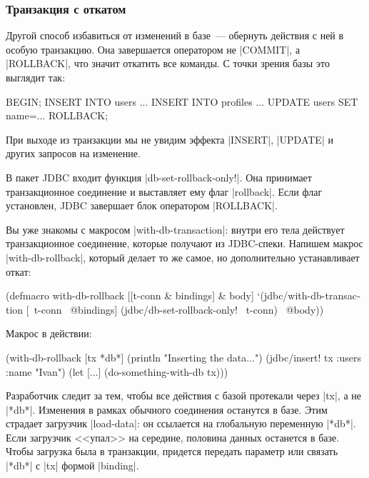 \subsubsection*{Транзакция с откатом}

Другой способ избавиться от изменений в базе~--- обернуть действия с ней в
особую транзакцию. Она завершается оператором не \spverb|COMMIT|, а
\spverb|ROLLBACK|, что значит откатить все команды. С точки зрения базы это
выглядит так:

\begin{english}
  \begin{sql}
BEGIN;
INSERT INTO users ...
INSERT INTO profiles ...
UPDATE users SET name=...
ROLLBACK;
  \end{sql}
\end{english}

При выходе из транзакции мы не увидим эффекта \spverb|INSERT|, \spverb|UPDATE| и
других запросов на изменение.

В пакет JDBC входит функция \spverb|db-set-rollback-only!|. Она принимает
транзакционное соединение и выставляет ему флаг \spverb|rollback|. Если флаг
установлен, JDBC завершает блок оператором \spverb|ROLLBACK|.

Вы уже знакомы с макросом \spverb|with-db-transaction|: внутри его тела
действует транзакционное соединение, которые получают из JDBC-спеки. Напишем
макрос \spverb|with-db-rollback|, который делает то же самое, но дополнительно
устанавливает откат:

\begin{english}
  \begin{clojure}
(defmacro with-db-rollback
  [[t-conn & bindings] & body]
  `(jdbc/with-db-transaction [~t-conn ~@bindings]
     (jdbc/db-set-rollback-only! ~t-conn)
     ~@body))
  \end{clojure}
\end{english}

Макрос в действии:

\begin{english}
  \begin{clojure}
(with-db-rollback [tx *db*]
  (println "Inserting the data...")
  (jdbc/insert! tx :users {:name "Ivan"})
  (let [...]
    (do-something-with-db tx)))
  \end{clojure}
\end{english}

Разработчик следит за тем, чтобы все действия с базой протекали через
\spverb|tx|, а не \spverb|*db*|. Изменения в рамках обычного соединения
останутся в базе. Этим страдает загрузчик \spverb|load-data|: он ссылается на
глобальную переменную \spverb|*db*|. Если загрузчик <<упал>> на середине,
половина данных останется в базе. Чтобы загрузка была в транзакции, придется
передать параметр или связать \spverb|*db*| с \spverb|tx| формой
\spverb|binding|.

